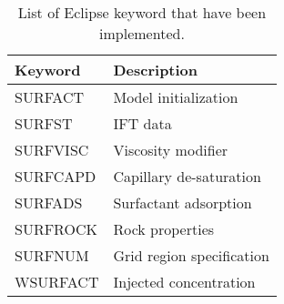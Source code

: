 \documentclass[11pt]{amsart}
\begin{document}
\begin{table}[h]
  \centering
  \begin{tabular}[t]{|l|l|}
    \hline
    Keyword&Description\\
    \hline
    SURFACT& Model initialization\\
    \hline
    SURFST& IFT data\\
    \hline
    SURFVISC& Viscosity modifier\\
    \hline
    SURFCAPD& Capillary de-saturation\\
    \hline
    SURFADS& Surfactant adsorption\\
    \hline
    SURFROCK& Rock properties\\
    \hline
    SURFNUM& Grid region specification\\
    \hline
    WSURFACT& Injected concentration\\
    \hline
  \end{tabular}
  \caption{List of Eclipse keyword that have been implemented.}
  \label{tab:eclipsekeyword}
\end{table}

\printbibliography
\end{document}
